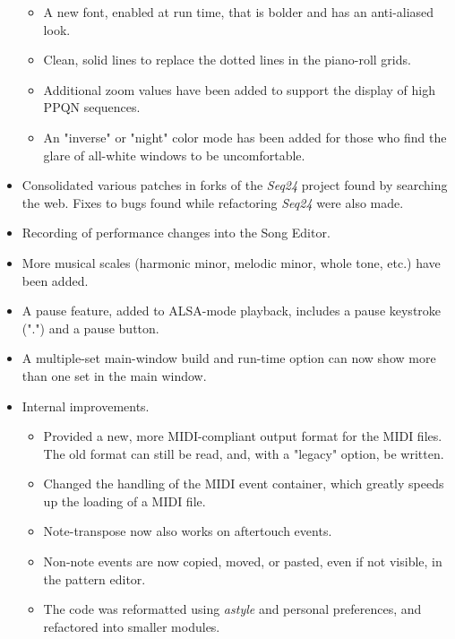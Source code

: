 \documentclass[
 11pt,
 twoside,
 a4paper,
 headinclude,
 footinclude,
 final                                 %
]{article}
\begin{document}
\begin{itemize}
\begin{itemize}
         \item A new font, enabled at run time, that is bolder and has an
            anti-aliased look.
         \item Clean, solid lines to replace the dotted lines in the piano-roll
            grids.
         \item Additional zoom values have been added to support the display
            of high PPQN sequences.
         \item An "inverse" or "night" color mode has been added for those
            who find the glare of all-white windows to be uncomfortable.
      \end{itemize}
      \item Consolidated various patches in forks of the \textsl{Seq24}
         project found by searching the web.  Fixes to bugs found while
         refactoring \textsl{Seq24} were also made.
      \item Recording of performance changes into the Song Editor.
      \item More musical scales (harmonic minor, melodic minor,
         whole tone, etc.) have been added.
      \item A pause feature, added to ALSA-mode playback,
         includes a pause keystroke (".") and a pause button.
      \item A multiple-set main-window build and run-time option can now
         show more than one set in the main window.
      \item Internal improvements.
      \begin{itemize}
         \item Provided a new, more MIDI-compliant output format for the MIDI
            files.  The old format can still be read, and, with a "legacy"
            option, be written.
         \item Changed the handling of the MIDI event container, which greatly
            speeds up the loading of a MIDI file.
         \item Note-transpose now also works on aftertouch events.
         \item Non-note events are now copied, moved, or pasted, even if not
            visible, in the pattern editor.
         \item The code was reformatted using \textsl{astyle} and
            personal preferences, and refactored into smaller modules.

\end{itemize}
\end{itemize}
\end{document}
